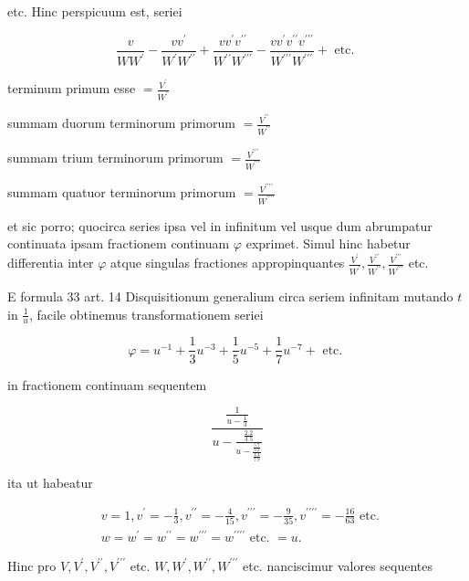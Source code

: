 \documentclass[10pt]{article}
\begin{document}
etc. Hinc perspicuum est, seriei

\[
\frac{v}{W W^{\prime}}-\frac{v v^{\prime}}{W^{\prime} W^{\prime \prime}}+\frac{v v^{\prime} v^{\prime \prime}}{W^{\prime \prime} W^{\prime \prime \prime}}-\frac{v v^{\prime} v^{\prime \prime} v^{\prime \prime \prime}}{W^{\prime \prime \prime} W^{\prime \prime \prime}}+\text { etc. }
\]

terminum primum esse \(=\frac{V^{\prime}}{W^{\prime}}\)

summam duorum terminorum primorum \(=\frac{V^{\prime \prime}}{W^{\prime \prime}}\)

summam trium terminorum primorum \(=\frac{V^{\prime \prime \prime}}{W^{\prime \prime \prime}}\)

summam quatuor terminorum primorum \(=\frac{V^{\prime \prime \prime \prime}}{W^{\prime \prime \prime \prime}}\)

et sic porro; quocirca series ipsa vel in infinitum vel usque dum abrumpatur continuata ipsam fractionem continuam \(\varphi\) exprimet. Simul hinc habetur differentia inter \(\varphi\) atque singulas fractiones appropinquantes \(\frac{V^{\prime}}{W^{\prime}}, \frac{V^{\prime \prime}}{W^{\prime \prime}}, \frac{V^{\prime \prime \prime}}{W^{\prime \prime \prime}}\) etc.

E formula 33 art. 14 Disquisitionum generalium circa seriem infinitam mutando \(t\) in \(\frac{1}{u}\), facile obtinemus transformationem seriei

\[
\varphi=u^{-1}+\frac{1}{3} u^{-3}+\frac{1}{5} u^{-5}+\frac{1}{7} u^{-7}+\text { etc. }
\]

in fractionem continuam sequentem

\[
\frac{\frac{1}{u-\frac{1}{3}}}{u-\frac{\frac{2.2}{3.5}}{u-\frac{\frac{5.7}{3.3}}{\frac{4.4}{7.9}}}}
\]

ita ut habeatur

\[
\begin{aligned}
& v=1, v^{\prime}=-\frac{1}{3}, v^{\prime \prime}=-\frac{4}{15}, v^{\prime \prime \prime}=-\frac{9}{35}, v^{\prime \prime \prime \prime}=-\frac{16}{63} \text { etc. } \\
& w=w^{\prime}=w^{\prime \prime}=w^{\prime \prime \prime}=w^{\prime \prime \prime \prime} \text { etc. }=u .
\end{aligned}
\]

Hinc pro \(V, V^{\prime}, V^{\prime \prime}, V^{\prime \prime \prime}\) etc. \(W, W^{\prime}, W^{\prime \prime}, W^{\prime \prime \prime}\) etc. nanciscimur valores sequentes
\end{document}
